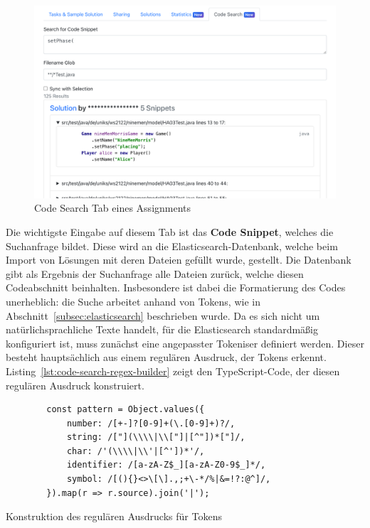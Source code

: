 \begin{figure}
    \centering
    \includegraphics[width=\textwidth]{images/assignment-code-search.png}
    \caption{Code Search Tab eines Assignments}
    \label{fig:assignment-code-search}
\end{figure}

Die wichtigste Eingabe auf diesem Tab ist das \textbf{Code Snippet}, welches die Suchanfrage bildet.
Diese wird an die Elasticsearch-Datenbank, welche beim Import von Lösungen mit deren Dateien gefüllt wurde, gestellt.
Die Datenbank gibt als Ergebnis der Suchanfrage alle Dateien zurück, welche diesen Codeabschnitt beinhalten.
Insbesondere ist dabei die Formatierung des Codes unerheblich:
die Suche arbeitet anhand von Tokens, wie in Abschnitt~\ref{subsec:elasticsearch} beschrieben wurde.
Da es sich nicht um natürlichsprachliche Texte handelt, für die Elasticsearch standardmäßig konfiguriert ist, muss zunächst eine angepasster Tokeniser definiert werden.
Dieser besteht hauptsächlich aus einem regulären Ausdruck, der Tokens erkennt.
Listing~\ref{lst:code-search-regex-builder} zeigt den TypeScript-Code, der diesen regulären Ausdruck konstruiert.

\begin{listing}
    \centering
    \begin{verbatim}
        const pattern = Object.values({
            number: /[+-]?[0-9]+(\.[0-9]+)?/,
            string: /["](\\\\|\\["]|[^"])*["]/,
            char: /'(\\\\|\\'|[^'])*'/,
            identifier: /[a-zA-Z$_][a-zA-Z0-9$_]*/,
            symbol: /[(){}<>\[\].,;+\-*/%|&=!?:@^]/,
        }).map(r => r.source).join('|');
    \end{verbatim}
    \caption{Konstruktion des regulären Ausdrucks für Tokens}
    \label{lst:code-search-regex-builder}
\end{listing}

